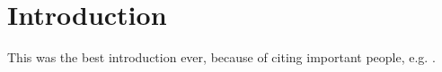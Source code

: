 \chapter{Introduction}
\label{cha:intro}
\Blindtext
This was the best introduction ever, because of citing important people, e.g. \cite{feynman1965}.
